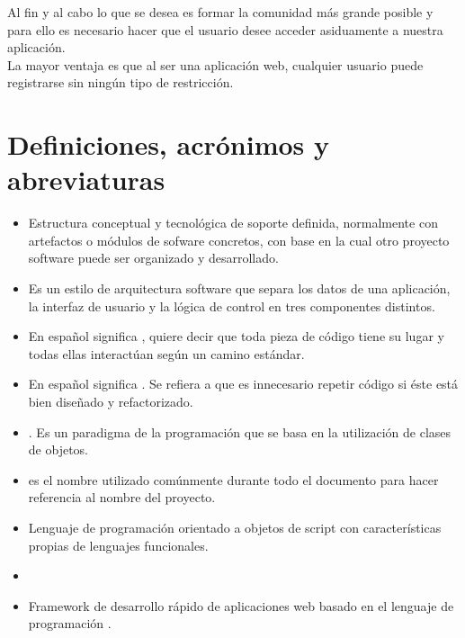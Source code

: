 Al fin y al cabo lo que se desea es formar la comunidad más grande
posible y para ello es necesario hacer que el usuario desee acceder
asiduamente a nuestra aplicación.\\

La mayor ventaja es que al ser una aplicación web, cualquier usuario
puede registrarse sin ningún tipo de restricción.

\section{Definiciones, acrónimos y abreviaturas}

\begin{itemize}
  \item {} Estructura conceptual y tecnológica de
    soporte definida, normalmente con artefactos o módulos de sofware
    concretos, con base en la cual otro proyecto software puede ser
    organizado y desarrollado.
  \item {} Es un estilo de
    arquitectura software que separa los datos de una aplicación, la
    interfaz de usuario y la lógica de control en tres componentes
    distintos.
  \item {} En español
    significa , quiere
    decir que toda pieza de código tiene su lugar y todas ellas
    interactúan según un camino estándar.
  \item {} En español significa
    . Se refiera a que es innecesario repetir
    código si éste está bien diseñado y refactorizado.
  \item {} . Es un
    paradigma de la programación que se basa en la utilización de
    clases de objetos.
  \item {} es el nombre utilizado
    comúnmente durante todo el documento para hacer referencia al
    nombre del proyecto.
  \item {} Lenguaje de programación orientado a objetos
    de script con características propias de lenguajes funcionales.
  \item {} 
  \item {} Framework de desarrollo rápido
    de aplicaciones web basado en el lenguaje de programación
    .

\end{itemize}
